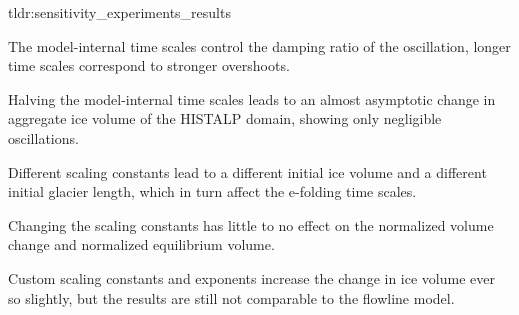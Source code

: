     \begin{tldrbox}{tldr:sensitivity_experiments_results}
      \item The model-internal time scales control the damping ratio of the oscillation, longer time scales correspond to stronger overshoots.
      \item Halving the model-internal time scales leads to an almost asymptotic change in aggregate ice volume of the HISTALP domain, showing only negligible oscillations.
      \item Different scaling constants lead to a different initial ice volume and a different initial glacier length, which in turn affect the e-folding time scales.
      \item Changing the scaling constants has little to no effect on the normalized volume change and normalized equilibrium volume.
      \item Custom scaling constants and exponents increase the change in ice volume ever so slightly, but the results are still not comparable to the flowline model.
    \end{tldrbox}
    
